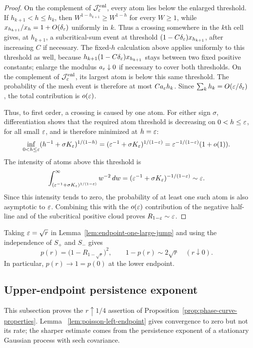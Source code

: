 \begin{proof}
On the complement of \(\mathcal J_\varepsilon^{\rm enl}\), every atom lies below
the enlarged threshold. If \(h_{k+1}<h\le h_k\), then
\(W^{1-h_{k+1}}\ge W^{1-h}\) for every \(W\ge1\), while
\(x_{h_{k+1}}/x_h=1+O(\delta_\varepsilon)\) uniformly in \(k\). Thus a crossing
somewhere in the \(k\)th cell gives, at \(h_{k+1}\), a subcritical-sum event
at threshold \((1-C\delta_\varepsilon)x_{h_{k+1}}\), after increasing \(C\) if
necessary. The
fixed-\(h\) calculation above applies uniformly to this threshold as well,
because \(h_{k+1}(1-C\delta_\varepsilon)x_{h_{k+1}}\) stays between two fixed positive
constants; enlarge the modulus \(a_\varepsilon\downarrow0\) if necessary to cover
both thresholds. On the complement of \(\mathcal J_\varepsilon^{\rm enl}\), its largest
atom is below this same threshold. The probability of the mesh event is
therefore at most \(Ca_\varepsilon h_k\). Since
\(\sum_kh_k=O(\varepsilon/\delta_\varepsilon)\), the total contribution is \(o(\varepsilon)\).

Thus, to first order, a crossing is caused by one atom. For either sign
\(\sigma\), differentiation shows
that the required atom threshold is decreasing on \(0<h\le\varepsilon\), for all
small \(\varepsilon\), and is therefore minimized at \(h=\varepsilon\):
\[
    \inf_{0<h\le\varepsilon}
    (h^{-1}+\sigma K_\varepsilon)^{1/(1-h)}
    =
    (\varepsilon^{-1}+\sigma K_\varepsilon)^{1/(1-\varepsilon)}
    =
    \varepsilon^{-1/(1-\varepsilon)}(1+o(1)).
\]
The intensity of atoms above this threshold is
\[
    \int_{(\varepsilon^{-1}+\sigma K_\varepsilon)^{1/(1-\varepsilon)}}^\infty
    w^{-2}\,dw
    =
    (\varepsilon^{-1}+\sigma K_\varepsilon)^{-1/(1-\varepsilon)}
    \sim\varepsilon.
\]
Since this intensity tends to zero, the probability of at least one such atom is also asymptotic to $\varepsilon$. Combining this with the $o(\varepsilon)$ contribution of the negative half-line and of the subcritical positive cloud proves $R_{1-\varepsilon}\sim\varepsilon$.
\end{proof}

Taking \(\varepsilon=\sqrt r\) in Lemma~\ref{lem:endpoint-one-large-jump} and using
the independence of \(S_+\) and \(S_-\) gives
\[
    p(r)=\bigl(1-R_{1-\sqrt r}\bigr)^2,
    \qquad
    1-p(r)\sim2\sqrt r
    \quad(r\downarrow0).
\]
In particular, \(p(r)\to1=p(0)\) at the lower endpoint.

\subsection{Upper-endpoint persistence exponent}

This subsection proves the \(r\uparrow1/4\) assertion of
Proposition~\ref{prop:phase-curve-properties}. Lemma
~\ref{lem:poisson-left-endpoint} gives convergence to zero but not its rate;
the sharper estimate comes from the persistence exponent of a stationary
Gaussian process with sech covariance.

